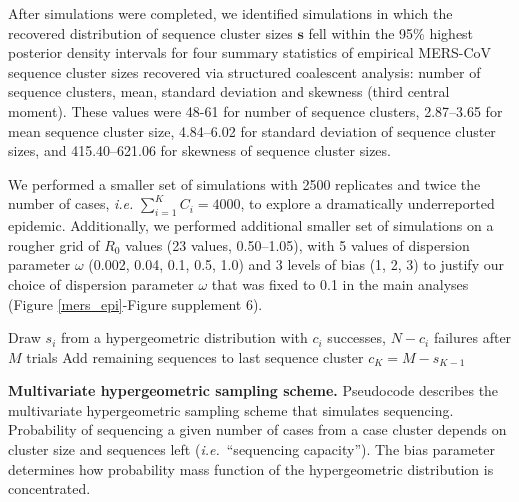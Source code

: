 \documentclass[9pt,lineno]{elife}
\begin{document}
After simulations were completed, we identified simulations in which the recovered distribution of sequence cluster sizes $\mathbf{s}$ fell within the 95\% highest posterior density intervals for four summary statistics of empirical MERS-CoV sequence cluster sizes recovered via structured coalescent analysis: number of sequence clusters, mean, standard deviation and skewness (third central moment).
These values were 48-61 for number of sequence clusters, 2.87--3.65 for mean sequence cluster size, 4.84--6.02 for standard deviation of sequence cluster sizes, and 415.40--621.06 for skewness of sequence cluster sizes.

We performed a smaller set of simulations with 2500 replicates and twice the number of cases, \textit{i.e.} $\sum_{i=1}^{K} C_{i} = 4000$, to explore a dramatically underreported epidemic.
Additionally, we performed additional smaller set of simulations on a rougher grid of $R_{0}$ values (23 values, 0.50--1.05), with 5 values of dispersion parameter $\omega$ (0.002, 0.04, 0.1, 0.5, 1.0) and 3 levels of bias (1, 2, 3) to justify our choice of dispersion parameter $\omega$ that was fixed to 0.1 in the main analyses (Figure \ref{mers_epi}-Figure supplement 6).

\begin{algorithm}[H]
 Draw $s_i$ from a hypergeometric distribution with $c_i$ successes, $N-c_i$ failures after $M$ trials\;
 Add remaining sequences to last sequence cluster $c_K = M - s_{K-1}$\;
 \caption{\textbf{Multivariate hypergeometric sampling scheme.}
 Pseudocode describes the multivariate hypergeometric sampling scheme that simulates sequencing.
 Probability of sequencing a given number of cases from a case cluster depends on cluster size and sequences left (\textit{i.e.}\ ``sequencing capacity'').
 The bias parameter determines how probability mass function of the hypergeometric distribution is concentrated.
 }
 \label{hypergeometric}
\end{algorithm}
\end{document}
